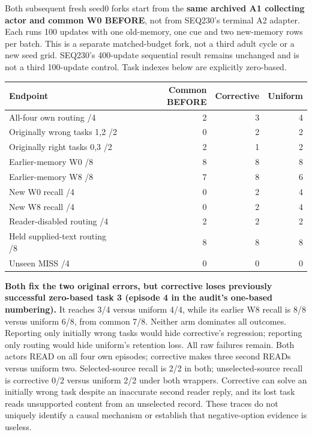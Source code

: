 \documentclass[11pt]{article}
\begin{document}
Both subsequent fresh seed0 forks start from the \textbf{same archived A1 collecting
actor and common W0 BEFORE}, not from SEQ230's terminal A2 adapter. Each runs
100 updates with one old-memory, one cue and two new-memory rows per batch.
This is a separate matched-budget fork, not a third adult cycle or a new seed
grid. SEQ230's 400-update sequential result remains unchanged and is not a
third 100-update control. Task indexes below are explicitly zero-based.

\begin{center}
\small
\begin{tabular}{lrrr}
\toprule
Endpoint & Common BEFORE & Corrective & Uniform \\
\midrule
All-four own routing /4 & 2 & 3 & 4 \\
Originally wrong tasks 1,2 /2 & 0 & 2 & 2 \\
Originally right tasks 0,3 /2 & 2 & 1 & 2 \\
Earlier-memory W0 /8 & 8 & 8 & 8 \\
Earlier-memory W8 /8 & 7 & 8 & 6 \\
New W0 recall /4 & 0 & 2 & 4 \\
New W8 recall /4 & 0 & 2 & 4 \\
Reader-disabled routing /4 & 2 & 2 & 2 \\
Held supplied-text routing /8 & 8 & 8 & 8 \\
Unseen MISS /4 & 0 & 0 & 0 \\
\bottomrule
\end{tabular}
\end{center}

\textbf{Both fix the two original errors, but corrective loses previously successful
zero-based task 3 (episode 4 in the audit's one-based numbering).} It reaches
3/4 versus uniform 4/4, while its earlier W8 recall is 8/8 versus uniform 6/8,
from common 7/8. Neither arm dominates all outcomes. Reporting only initially
wrong tasks would hide corrective's regression; reporting only routing would
hide uniform's retention loss. All raw failures remain. Both actors READ on all
four own episodes; corrective makes three second READs versus uniform two.
Selected-source recall is 2/2 in both; unselected-source recall is corrective
0/2 versus uniform 2/2 under both wrappers. Corrective can solve an initially
wrong task despite an inaccurate second reader reply, and its lost task reads
unsupported content from an unselected record. These traces do not uniquely
identify a causal mechanism or establish that negative-option evidence is useless.
\end{document}
